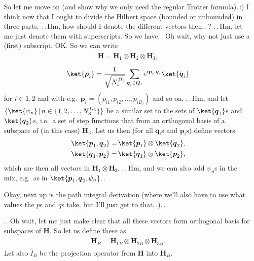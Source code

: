 \documentclass{report}
\begin{document}
So let me move on (and show why we only need the regular Trotter formula).\,:) I think now that I ought to divide the Hilbert space (bounded or unbounded) in three parts. .\,.\,Hm, how should I denote the different vectors then.\,.\,? .\,.\,Hm, let me just denote them with superscripts. So we have.\,. Oh wait, why not just use a (first) subscript. OK. So we can write
\begin{align}
\begin{aligned}
	\textbf{H} = \textbf{H}_1 \otimes \textbf{H}_2 \otimes \textbf{H}_3,
\end{aligned}
\end{align} 
\begin{align}
\begin{aligned}
	\ket{\boldsymbol{p}_i} = \frac{1}{\sqrt{N_i^{D_i}}} \sum_{\boldsymbol{q}_i\in Q_i}
		e^{i \boldsymbol{p}_i \cdot \boldsymbol{q}_i} \ket{\boldsymbol{q}_i}
	\label{ket_pi_01}
\end{aligned}
\end{align} 
for $i\in{1, 2}$ and with e.g.\ $\boldsymbol{p}_i = (p_{i1}, p_{i2}, \ldots, p_{iD_i})$ and so on. .\,.\,Hm, and let $\{\ket{\psi_n} \,|\, n\in \{1, 2, \ldots, N_3^{D_3}\}\}$ be a similar set to the sets of $\ket{\boldsymbol{q}_1}$s and $\ket{\boldsymbol{q}_2}$s, i.e.\ a set of step functions that from an orthogonal basis of a subspace of (in this case) $\textbf{H}_3$. Let us then (for all $\boldsymbol{q}_i$s and $\boldsymbol{p}_i$s) define vectors
\begin{align}
\begin{aligned}
	\ket{\boldsymbol{p}_1, \boldsymbol{q}_2} =&\, \ket{\boldsymbol{p}_1} \otimes \ket{\boldsymbol{q}_2},\\
	\ket{\boldsymbol{q}_1, \boldsymbol{p}_2} =&\, \ket{\boldsymbol{q}_1} \otimes \ket{\boldsymbol{p}_2},
\end{aligned}
\end{align} 
which are then all vectors in $\textbf{H}_1 \otimes \textbf{H}_2$. .\,.\,Hm, and we can also add $\psi_n$s in the mix, e.g.\ as in $\ket{\boldsymbol{p}_1, \boldsymbol{q}_2, \psi_n}$.\,. 

Okay, next up is the path integral derivation (where we'll also have to use what values the $p$s and $q$s take, but I'll just get to that.\,.).\,. 

.\,.\,Oh wait, let me just make clear that all these vectors form orthogonal basis for subspaces of \textbf{H}. So let us define these as 
\begin{align}
\begin{aligned}
	\textbf{H}_B = \textbf{H}_{1B} \otimes \textbf{H}_{2B} \otimes \textbf{H}_{3B}.
\end{aligned}
\end{align} 
Let also $\hat I_B$ be the projection operator from \textbf{H} into $\textbf{H}_B$. %
\end{document}

